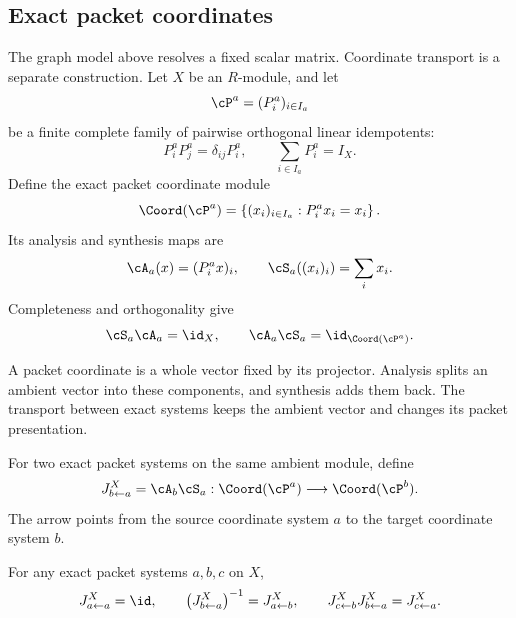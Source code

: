 \subsection{Exact packet coordinates}

The graph model above resolves a fixed scalar matrix.  Coordinate transport
is a separate construction.  Let $X$ be an $R$-module, and let
\[
\cP^a=(P^a_i)_{i\in I_a}
\]
be a finite complete family of pairwise orthogonal linear idempotents:
\[
P^a_iP^a_j=\delta_{ij}P^a_i,
\qquad
\sum_{i\in I_a}P^a_i=I_X.
\]
Define the exact packet coordinate module
\[
\Coord(\cP^a)
=
\left\{(x_i)_{i\in I_a}:P^a_ix_i=x_i\right\}.
\]
Its analysis and synthesis maps are
\[
\cA_a(x)=(P^a_ix)_i,
\qquad
\cS_a((x_i)_i)=\sum_ix_i.
\]
Completeness and orthogonality give
\[
\cS_a\cA_a=\id_X,
\qquad
\cA_a\cS_a=\id_{\Coord(\cP^a)}.
\]

\begin{keyidea}[title={What a packet coordinate contains}]
A packet coordinate is a whole vector fixed by its projector. Analysis splits
an ambient vector into these components, and synthesis adds them back. The
transport between exact systems keeps the ambient vector and changes its
packet presentation.
\end{keyidea}

\begin{definition}
\label{def:canonical-J}
For two exact packet systems on the same ambient module, define
\[
  J^X_{b\leftarrow a}
  =
  \cA_b\cS_a:
  \Coord(\cP^a)\longrightarrow\Coord(\cP^b).
\]
The arrow points from the source coordinate system $a$ to the target
coordinate system $b$.
\end{definition}

\begin{theorem}
\label{thm:J-cocycle}
For any exact packet systems $a,b,c$ on $X$,
\[
J^X_{a\leftarrow a}=\id,
\qquad
\left(J^X_{b\leftarrow a}\right)^{-1}=J^X_{a\leftarrow b},
\qquad
J^X_{c\leftarrow b}J^X_{b\leftarrow a}=J^X_{c\leftarrow a}.
\]
\end{theorem}

